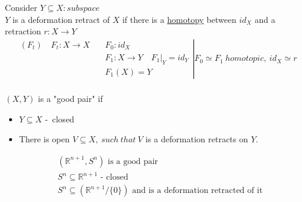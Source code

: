\documentclass[11pt,a4paper]{report}
\begin{document}
                \begin{defn} 
                  Consider $Y \subseteq X: subspace$\\
                  $Y$ is a deformation retract of $X$ if there is a \underline{homotopy} between $id_X$ and a retraction $r: X \rightarrow Y$\\
                  \begin{align*}
                    \left.
                    \begin{array}{cl}
                      (F_t) \quad F_t: X \rightarrow X \quad &F_0: id_X\\
                                           &F_1: X \rightarrow Y \quad F_1|_Y = id_Y\\
                                           &F_1(X) = Y
                    \end{array}
                                             \right| F_0 \simeq F_1\ homotopic,\ id_X \simeq r\\
                  \end{align*}
                \end{defn}
                $(X, Y)$ is a "good pair" if
                \begin{itemize}
                \item $Y \subseteq X$ -\ closed
                \item There is open $V \subseteq X,\ such \ that \ V$ is a deformation retracts on $Y$.
                \end{itemize}

                \begin{Ex}
                \begin{align*}
                  &(\mathbb{R}^{n+1}, S^n) \textrm{ is a good pair}\\
                  &S^n \subseteq \mathbb{R}^{n+1} \textrm{ - closed}\\
                  &S^n \subseteq (\mathbb{R}^{n+1} / \{0\}) \textrm{ and is a deformation retracted of it}
                \end{align*}
                \end{Ex}
\end{document}
